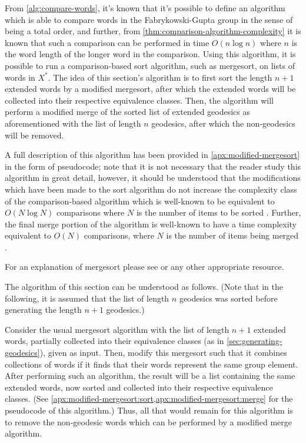 From \cref{alg:compare-words}, it's known that it's possible to define an algorithm which is able to compare words in the Fabrykowski-Gupta group in the sense of being a total order, and further, from \cref{thm:comparison-algorithm-complexity} it is known that such a comparison can be performed in time $O(n\log n)$ where $n$ is the word length of the longer word in the comparison.
Using this algorithm, it is possible to run a comparison-based sort algorithm, such as mergesort, on lists of words in $X^\ast$.
The idea of this section's algorithm is to first sort the length $n+1$ extended words by a modified mergesort, after which the extended words will be collected into their respective equivalence classes.
Then, the algorithm will perform a modified merge of the sorted list of extended geodesics as aforementioned with the list of length $n$ geodesics, after which the non-geodesics will be removed.

A full description of this algorithm has been provided in \cref{apx:modified-mergesort} in the form of pseudocode;
note that it is not necessary that the reader study this algorithm in great detail, however, it should be understood that the modifications which have been made to the sort algorithm do not increase the complexity class of the comparison-based algorithm which is well-known to be equivalent to $O(N\log N)$ comparisons where $N$ is the number of items to be sorted \cite{MergesortComplexity,KnuthSortSearch,MergesortLecture}.
Further, the final merge portion of the algorithm is well-known to have a time complexity equivalent to $O(N)$ comparisons, where $N$ is the number of items being merged \cite{MergesortLecture}.

For an explanation of mergesort please see \cite{KnuthSortSearch,MergesortLecture} or any other appropriate resource.

The algorithm of this section can be understood as follows.
(Note that in the following, it is assumed that the list of length $n$ geodesics was sorted before generating the length $n+1$ geodesics.)

Consider the usual mergesort algorithm with the list of length $n+1$ extended words, partially collected into their equivalence classes (as in \cref{sec:generating-geodesics}), given as input.
Then, modify this mergesort such that it combines collections of words if it finds that their words represent the same group element.
After performing such an algorithm, the result will be a list containing the same extended words, now sorted and collected into their respective equivalence classes.
(See \cref{apx:modified-mergesort:sort,apx:modified-mergesort:merge} for the pseudocode of this algorithm.)
Thus, all that would remain for this algorithm is to remove the non-geodesic words which can be performed by a modified merge algorithm.

